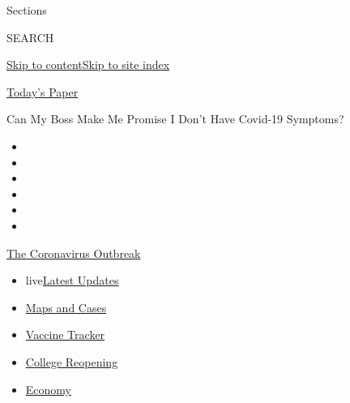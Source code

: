 Sections

SEARCH

\protect\hyperlink{site-content}{Skip to
content}\protect\hyperlink{site-index}{Skip to site index}

\href{https://myaccount.nytimes3xbfgragh.onion/auth/login?response_type=cookie\&client_id=vi}{}

\href{https://www.nytimes3xbfgragh.onion/section/todayspaper}{Today's
Paper}

Can My Boss Make Me Promise I Don't Have Covid-19 Symptoms?

\begin{itemize}
\item
\item
\item
\item
\item
\item
\end{itemize}

\href{https://www.nytimes3xbfgragh.onion/news-event/coronavirus?action=click\&pgtype=Article\&state=default\&region=TOP_BANNER\&context=storylines_menu}{The
Coronavirus Outbreak}

\begin{itemize}
\tightlist
\item
  live\href{https://www.nytimes3xbfgragh.onion/2020/08/04/world/coronavirus-covid-19.html?action=click\&pgtype=Article\&state=default\&region=TOP_BANNER\&context=storylines_menu}{Latest
  Updates}
\item
  \href{https://www.nytimes3xbfgragh.onion/interactive/2020/us/coronavirus-us-cases.html?action=click\&pgtype=Article\&state=default\&region=TOP_BANNER\&context=storylines_menu}{Maps
  and Cases}
\item
  \href{https://www.nytimes3xbfgragh.onion/interactive/2020/science/coronavirus-vaccine-tracker.html?action=click\&pgtype=Article\&state=default\&region=TOP_BANNER\&context=storylines_menu}{Vaccine
  Tracker}
\item
  \href{https://www.nytimes3xbfgragh.onion/2020/08/02/us/covid-college-reopening.html?action=click\&pgtype=Article\&state=default\&region=TOP_BANNER\&context=storylines_menu}{College
  Reopening}
\item
  \href{https://www.nytimes3xbfgragh.onion/live/2020/08/03/business/stock-market-today-coronavirus?action=click\&pgtype=Article\&state=default\&region=TOP_BANNER\&context=storylines_menu}{Economy}
\end{itemize}

